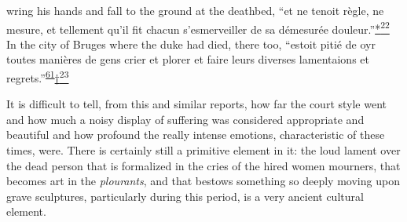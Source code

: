 wring his hands and fall to the ground at the deathbed, ``et ne tenoit
règle, ne mesure, et tellement qu'il fit chacun s'esmerveiller de sa
démesurée
douleur.''\protect\hypertarget{09_Chapter_Two__THE_CRAVING_FOR_A_M.xhtmlux5cux23id_2451}{\protect\hyperlink{23_NOTES.xhtmlux5cux23id_2452}{*\textsuperscript{22}}}
In the city of Bruges where the duke had died, there too, ``estoit pitié
de oyr toutes manières de gens crier et plorer et faire leurs diverses
lamentaions et
regrets.''\textsuperscript{\protect\hypertarget{09_Chapter_Two__THE_CRAVING_FOR_A_M.xhtmlux5cux23id_1966}{\protect\hyperlink{23_NOTES.xhtmlux5cux23id_1967}{61}}}\protect\hypertarget{09_Chapter_Two__THE_CRAVING_FOR_A_M.xhtmlux5cux23id_2453}{\protect\hyperlink{23_NOTES.xhtmlux5cux23id_2454}{†\textsuperscript{23}}}

It is difficult to tell, from this and similar reports, how far the
court style went and how much a noisy display of suffering was
considered appropriate and beautiful and how profound the really intense
emotions, characteristic of these times, were. There is certainly still
a primitive element in it: the loud lament over the dead person that is
formalized in the cries of the hired women mourners, that becomes art in
the \emph{plourants}, and that bestows something so deeply moving upon
grave sculptures, particularly during this period, is a very ancient
cultural element.

